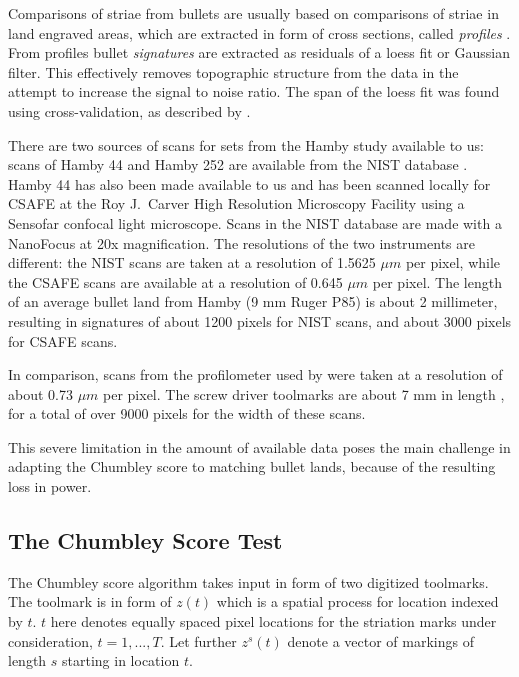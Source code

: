 \documentclass[12pt]{article}
\begin{document}
Comparisons of striae from bullets are usually based on comparisons of
striae in land engraved areas, which are extracted in form of cross
sections, called \emph{profiles} \citep{aoas,ma2004}. From profiles
bullet \emph{signatures} \citep{chu2013,aoas} are extracted as residuals
of a loess fit or Gaussian filter. This effectively removes topographic
structure from the data in the attempt to increase the signal to noise
ratio. The span of the loess fit was found using cross-validation, as
described by \citet{aoas}.

There are two sources of scans for sets from the Hamby study available
to us: scans of Hamby 44 and Hamby 252 are available from the NIST
database \citep{nist}. Hamby 44 has also been made available to us and
has been scanned locally for CSAFE at the Roy J.~Carver High Resolution
Microscopy Facility using a Sensofar confocal light microscope. Scans in
the NIST database are made with a NanoFocus at 20x magnification. The
resolutions of the two instruments are different: the NIST scans are
taken at a resolution of 1.5625 \(\mu m\) per pixel, while the CSAFE
scans are available at a resolution of 0.645 \(\mu m\) per pixel. The
length of an average bullet land from Hamby (9 mm Ruger P85) is about 2
millimeter, resulting in signatures of about 1200 pixels for NIST scans,
and about 3000 pixels for CSAFE scans.

In comparison, scans from the profilometer used by
\citet{chumbley, hadler} were taken at a resolution of about 0.73
\(\mu m\) per pixel. The screw driver toolmarks are about 7 mm in length
\citep{manytoolmarks1}, for a total of over 9000 pixels for the width of
these scans.

This severe limitation in the amount of available data poses the main
challenge in adapting the Chumbley score to matching bullet lands,
because of the resulting loss in power.

\subsection{The Chumbley Score Test}\label{the-chumbley-score-test}

The Chumbley score algorithm takes input in form of two digitized
toolmarks. The toolmark is in form of \(z(t)\) which is a spatial
process for location indexed by \(t\). \(t\) here denotes equally spaced
pixel locations for the striation marks under consideration,
\(t = 1, ..., T\). Let further \(z^s(t)\) denote a vector of markings of
length \(s\) starting in location \(t\).
\end{document}
